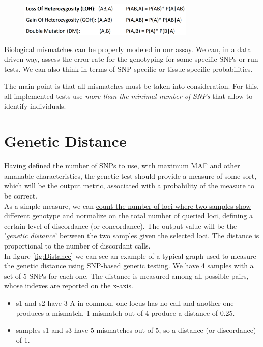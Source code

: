 \begin{figure}[ht]
	\centering
	\includegraphics[width=0.75\textwidth]{heterozygosity.PNG}
	\caption{} 
	\label{fig: heterozygosity}
\end{figure}

\bigskip
Biological mismatches can be properly modeled in our assay. We can, in a data
driven way, assess the error rate for the genotyping for some specific SNPs or
run tests. We can also think in terms of SNP-specific or tissue-specific
probabilities.

The main point is that all mismatches must be taken into consideration. For
this, all implemented tests use \emph{more than the minimal number of SNPs} that
allow to identify individuals. 


\section{Genetic Distance}

Having defined the number of SNPs to use, with maximum MAF and other amanable
characteristics, the genetic test should provide a measure of some sort, which
will be the output metric, associated with a probability of the measure to be
correct. \\

As a simple measure, we can \underline{count the number of loci where two
samples show different genotype} and normalize on the total number of queried
loci, defining a certain level of discordance (or concordance). The output value
will be the '\textit{genetic distance}' between the two samples given the
selected loci. The distance is proportional to the number of discordant calls.
\\

In figure \ref{fig:Distance} we can see an example of a typical graph used to
measure the genetic distance using SNP-based genetic testing. We have 4 samples
with a set of 5 SNPs for each one. The distance is measured among all possible
pairs, whose indexes are reported on the x-axis. 

\begin{itemize}
	\item s1 and s2 have 3 A in common, one locus has no call and another one
	produces a mismatch. 1 mismatch out of 4 produce a distance of 0.25.
	\item samples s1 and s3 have 5 mismatches out of 5, so a distance (or
	discordance) of 1. 
\end{itemize}


